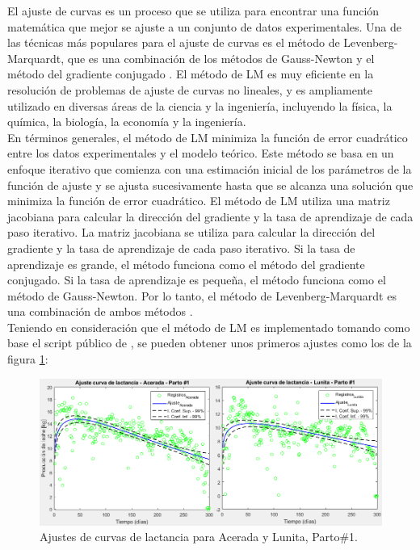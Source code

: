 El ajuste de curvas es un proceso que se utiliza para encontrar una función matemática que mejor se ajuste a un conjunto de datos experimentales. Una de las técnicas más populares para el ajuste de curvas es el método de Levenberg-Marquardt, que es una combinación de los métodos de Gauss-Newton y el método del gradiente conjugado \cite{levenberduke}. El método de LM es muy eficiente en la resolución de problemas de ajuste de curvas no lineales, y es ampliamente utilizado en diversas áreas de la ciencia y la ingeniería, incluyendo la física, la química, la biología, la economía y la ingeniería.\\

En términos generales, el método de LM minimiza la función de error cuadrático entre los datos experimentales y el modelo teórico. Este método se basa en un enfoque iterativo que comienza con una estimación inicial de los parámetros de la función de ajuste y se ajusta sucesivamente hasta que se alcanza una solución que minimiza la función de error cuadrático. El método de LM utiliza una matriz jacobiana para calcular la dirección del gradiente y la tasa de aprendizaje de cada paso iterativo. La matriz jacobiana se utiliza para calcular la dirección del gradiente y la tasa de aprendizaje de cada paso iterativo. Si la tasa de aprendizaje es grande, el método funciona como el método del gradiente conjugado. Si la tasa de aprendizaje es pequeña, el método funciona como el método de Gauss-Newton. Por lo tanto, el método de Levenberg-Marquardt es una combinación de ambos métodos \cite{levenberduke}.\\

Teniendo en consideración que el método de LM es implementado tomando como base el script público de \cite{levenberduke}, se pueden obtener unos primeros ajustes como los de la figura \ref{levenberg1}:

\begin{figure}[H]
	 \begin{center}
	 \includegraphics[scale=0.64]{img/lev1p1.png}
	 \end{center}
	 \caption{Ajustes de curvas de lactancia para Acerada y Lunita, Parto\#1.  \label{levenberg1}}
\end{figure}

